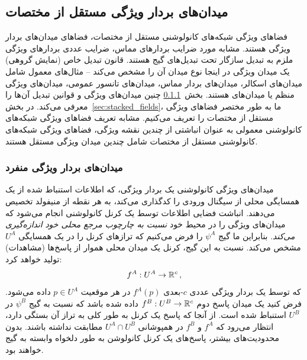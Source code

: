 

\subsection{میدان‌های بردار ویژگی مستقل از مختصات}
\label{sec:feature_fields}

فضاهای ویژگی شبکه‌های کانولوشنی مستقل از مختصات، فضاهای میدان‌های بردار ویژگی هستند.
مشابه مورد ضرایب بردارهای مماس، ضرایب عددی بردارهای ویژگی ملزم به تبدیل سازگار تحت تبدیل‌های گیج هستند.
قانون تبدیل خاص (نمایش گروهی) یک میدان ویژگی در اینجا نوع میدان آن را مشخص می‌کند – مثال‌های معمول شامل میدان‌های اسکالر، میدان‌های بردار مماس، میدان‌های تانسور عمومی، میدان‌های ویژگی منظم یا میدان‌های  هستند.
بخش~\ref{sec:individual_fields} چنین میدان‌های ویژگی و قوانین تبدیل آن‌ها را معرفی می‌کند.
در بخش~\ref{sec:stacked_fields}، ما به طور مختصر فضاهای ویژگی مستقل از مختصات را تعریف می‌کنیم.
مشابه تعریف فضاهای ویژگی شبکه‌های کانولوشنی معمولی به عنوان انباشتی از چندین نقشه ویژگی، فضاهای ویژگی شبکه‌های کانولوشنی مستقل از مختصات شامل چندین میدان ویژگی مستقل هستند.




\subsubsection{میدان‌های بردار ویژگی منفرد}
\label{sec:individual_fields}
میدان‌های ویژگی کانولوشنی یک بردار ویژگی، که اطلاعات استنباط شده از یک همسایگی محلی از سیگنال ورودی را کدگذاری می‌کند، به هر نقطه از منیفولد تخصیص می‌دهند.
انباشت فضایی اطلاعات توسط یک کرنل کانولوشنی انجام می‌شود که میدان‌های ویژگی را در محیط خود \emph{نسبت به چارچوب مرجع محلی خود} \emph{اندازه‌گیری می‌کند}.
بنابراین ما گیج $\psi^A$ را فرض می‌کنیم که ترازهای کرنل را در یک همسایگی $U^A$ مشخص می‌کند.
نسبت به این گیج، کرنل یک میدان محلی هموار از پاسخ‌ها (مشاهدات) تولید خواهد کرد:
\begin{align}
	f^A:U^A\to\mathbb{R}^c \,,
\end{align}
که توسط یک بردار ویژگی عددی $c$-بعدی $f^A(p)$ در هر موقعیت $p\in U^A$ داده می‌شود.
فرض کنید یک میدان پاسخ دوم $f^B:U^B\to\mathbb{R}^c$ داده شده باشد که نسبت به گیج $\psi^B$ در $U^B$ استنباط شده است.
از آنجا که پاسخ یک کرنل به طور کلی به تراز آن بستگی دارد، انتظار می‌رود که $f^A$ و $f^B$ در همپوشانی $U^A\cap U^B$ مطابقت نداشته باشند.
بدون محدودیت‌های بیشتر، پاسخ‌های یک کرنل کانولوشن به طور دلخواه وابسته به گیج خواهند بود.

